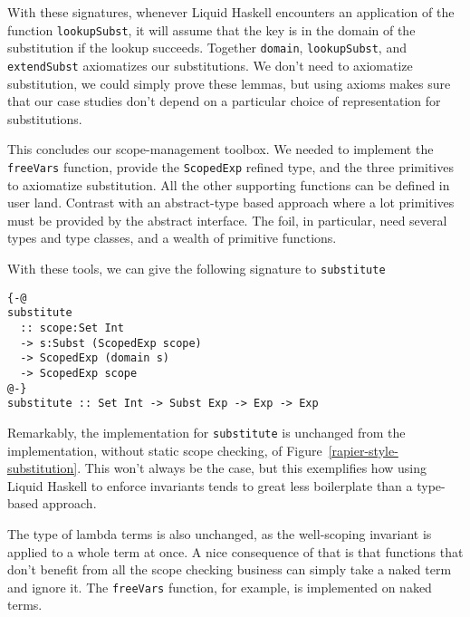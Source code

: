 \documentclass[sigconf, anonymous, review]{acmart}
\newcommand{\tc}[1]{{\small\texttt{#1}}}
\begin{document}
With these signatures, whenever Liquid Haskell encounters an application of the
function \tc{lookupSubst}, it will assume that the key is in the domain of the
substitution if the lookup succeeds. Together \tc{domain}, \tc{lookupSubst}, and
\tc{extendSubst} axiomatizes our substitutions. We don't need to axiomatize
substitution, we could simply prove these lemmas, but using axioms makes sure
that our case studies don't depend on a particular choice of representation for
substitutions.

This concludes our scope-management toolbox. We needed to implement the
\tc{freeVars} function, provide the \tc{ScopedExp} refined type, and the three
primitives to axiomatize substitution. All the other supporting functions can be
defined in user land. Contrast with an abstract-type based approach where a lot
primitives must be provided by the abstract interface. The foil, in particular,
need several types and type classes, and a wealth of primitive functions.

With these tools, we can give the following signature to \tc{substitute}
\begin{verbatim}
{-@
substitute
  :: scope:Set Int
  -> s:Subst (ScopedExp scope)
  -> ScopedExp (domain s)
  -> ScopedExp scope
@-}
substitute :: Set Int -> Subst Exp -> Exp -> Exp
\end{verbatim}
Remarkably, the implementation for \tc{substitute} is unchanged from the
implementation, without static scope checking, of
Figure~\ref{rapier-style-substitution}. This won't always be the case, but this
exemplifies how using Liquid Haskell to enforce invariants tends to great less
boilerplate than a type-based approach.

The type of lambda terms is also unchanged, as the well-scoping invariant is
applied to a whole term at once. A nice consequence of that is that functions
that don't benefit from all the scope checking business can simply take a naked
term and ignore it. The \tc{freeVars} function, for example, is implemented on
naked terms.
\end{document}
